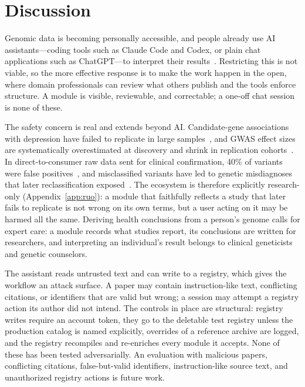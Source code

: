 \documentclass[11pt,a4paper]{article}
\begin{document}
\section{Discussion}

Genomic data is becoming personally accessible, and people already use AI
assistants---coding tools such as Claude Code and Codex, or plain chat
applications such as ChatGPT---to interpret their
results~\citep[e.g.,][]{conyngham2026rosie}. Restricting this is not viable, so the more
effective response is to make the work happen in the open, where domain
professionals can review what others publish and the tools enforce structure. A
module is visible, reviewable, and correctable; a one-off chat session is none
of these.

The safety concern is real and extends beyond AI. Candidate-gene
associations with depression have failed to replicate in large
samples~\citep{border2019no}, and GWAS effect sizes are systematically
overestimated at discovery and shrink in replication
cohorts~\citep{palmer2017winners}. In direct-to-consumer raw data sent for
clinical confirmation, 40\% of variants were false
positives~\citep{tandyconnor2018false}, and misclassified variants have led to
genetic misdiagnoses that later reclassification
exposed~\citep{manrai2016genetic}. The ecosystem is therefore explicitly
research-only (Appendix~\ref{app:ruo}): a module that faithfully reflects a study that later fails to
replicate is not wrong on its own terms, but a user acting on it may be harmed
all the same. Deriving health conclusions from a person's genome calls for
expert care: a module records what studies report, its conclusions are
written for researchers, and interpreting an individual's result belongs to
clinical geneticists and genetic counselors.

The assistant reads untrusted text and can write to a registry, which gives
the workflow an attack surface. A paper may contain instruction-like text,
conflicting citations, or identifiers that are valid but wrong; a session may
attempt a registry action its author did not intend. The controls in place
are structural: registry writes require an account token, they go to the
deletable test registry unless the production catalog is named explicitly,
overrides of a reference archive are logged, and the registry recompiles and
re-enriches every module it accepts. None of these has been tested
adversarially. An evaluation with malicious papers, conflicting citations,
false-but-valid identifiers, instruction-like source text, and unauthorized
registry actions is future work.
\end{document}
